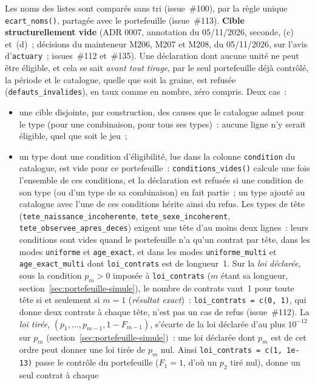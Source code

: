\documentclass[a4paper,11pt]{article}
\newcommand{\code}[1]{\texttt{\small #1}}
\begin{document}
\noindent
Les noms des listes sont comparés sans tri (issue~\#100), par la règle
unique \code{ecart\_noms()}, partagée avec le portefeuille (issue~\#113).
\textbf{Cible structurellement vide} (ADR 0007, annotation du 05/11/2026,
seconde, (c) et~(d)~; décisions du mainteneur M206, M207 et M208, du
05/11/2026, sur l'avis d'\code{actuary}~; issues~\#112 et~\#135). Une déclaration dont aucune unité ne peut
être éligible, et cela se sait \emph{avant tout tirage}, par le seul
portefeuille déjà contrôlé, la période et le catalogue, quelle que soit la
graine, est refusée (\code{defauts\_invalides}), en taux comme en
nombre, zéro compris. Deux cas~:
\begin{itemize}[leftmargin=*, itemsep=2pt]
  \item une cible disjointe, par construction, des causes que le catalogue
    admet pour le type (pour une combinaison, pour tous ses types)~: aucune
    ligne n'y serait éligible, quel que soit le jeu~;
  \item un type dont une condition d'éligibilité, lue dans la colonne
    \code{condition} du catalogue, est vide pour ce portefeuille~:
    \code{conditions\_vides()} calcule une fois l'ensemble de ces
    conditions, et la déclaration est refusée si une condition de son type
    (ou d'un type de sa combinaison) en fait partie~; un type ajouté au
    catalogue avec l'une de ces conditions hérite ainsi du refus. Les types
    de tête (\code{tete\_naissance\_incoherente},
    \code{tete\_sexe\_incoherent}, \code{tete\_observee\_apres\_deces})
    exigent une tête d'au moins deux lignes~: leurs conditions sont vides
    quand le portefeuille n'a qu'un contrat par tête, dans les modes
    \code{uniforme} et \code{age\_exact}, et dans les modes
    \code{uniforme\_multi} et \code{age\_exact\_multi} dont
    \code{loi\_contrats} est de longueur~1. Sur la \emph{loi déclarée},
    sous la condition $p_m > 0$ imposée à \code{loi\_contrats} ($m$ étant
    sa longueur, section~\ref{sec:portefeuille-simule}), le nombre de
    contrats vaut~1 pour toute tête si et seulement si $m = 1$
    (\emph{résultat exact})~: \code{loi\_contrats = c(0, 1)}, qui donne
    deux contrats à chaque tête, n'est pas un cas de refus (issue~\#112).
    La \emph{loi tirée}, $(p_1, \dots, p_{m-1}, 1 - F_{m-1})$, s'écarte de
    la loi déclarée d'au plus $10^{-12}$ sur $p_m$
    (section~\ref{sec:portefeuille-simule})~: une loi déclarée dont $p_m$
    est de cet ordre peut donner une loi tirée de $p_m$ nul. Ainsi
    \code{loi\_contrats = c(1, 1e-13)} passe le contrôle du portefeuille
    ($F_1 = 1$, d'où un $p_2$ tiré nul), donne un seul contrat à chaque

\end{itemize}
\end{document}
